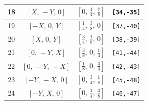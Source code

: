 \documentclass[fleqn,8pt]{jsarticle}
\begin{document}
\begin{longtable}{cccc}
18 & $\left[ X,\, - Y,\, 0 \right]$ & $\left[ 0,\, \frac{1}{4},\, \frac{7}{8} \right]$ & {\tt [34,-35]} \\ \hline
19 & $\left[ - X,\, 0,\, Y \right]$ & $\left[ \frac{1}{4},\, \frac{3}{8},\, 0 \right]$ & {\tt [37,-40]} \\ \hline
20 & $\left[ X,\, 0,\, Y \right]$ & $\left[ \frac{3}{4},\, \frac{1}{8},\, 0 \right]$ & {\tt [38,-39]} \\ \hline
21 & $\left[ 0,\, - Y,\, X \right]$ & $\left[ \frac{3}{8},\, 0,\, \frac{1}{4} \right]$ & {\tt [41,-44]} \\ \hline
22 & $\left[ 0,\, - Y,\, - X \right]$ & $\left[ \frac{1}{8},\, 0,\, \frac{3}{4} \right]$ & {\tt [42,-43]} \\ \hline
23 & $\left[ - Y,\, - X,\, 0 \right]$ & $\left[ 0,\, \frac{3}{4},\, \frac{1}{8} \right]$ & {\tt [45,-48]} \\ \hline
24 & $\left[ - Y,\, X,\, 0 \right]$ & $\left[ 0,\, \frac{1}{4},\, \frac{3}{8} \right]$ & {\tt [46,-47]} \\
\end{longtable}
\renewcommand{\arraystretch}{1.2}
\end{document}
